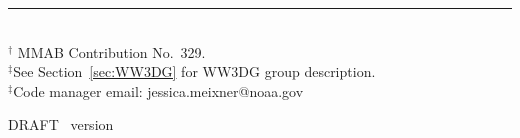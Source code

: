 \vfill

\noindent \rule{140mm}{0.5mm} \\
{\small $^\dag$ MMAB Contribution No.~329. \\
$^\ddag$See Section~\ref{sec:WW3DG} for WW3DG group description.\\
$^\ddag$Code manager email: jessica.meixner@noaa.gov}

\bpage

\pb

         {{\rm DRAFT} \hspace{20.5mm} \ws\ version \WWver}
\pagestyle{myheadings}
\setcounter{page}{1}

\cftsetpnumwidth{3em}
\cftsetrmarg{4em}  %

\tableofcontents

\pb
\pagestyle{empty}
\bpagea

\pb
\pagestyle{myheadings}



